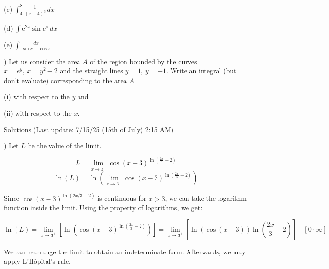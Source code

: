 \documentclass{article}
\begin{document}
\hfill

\noindent (c) $\displaystyle \int_4^8 \frac{1}{(x-4)^3}\, dx$

\hfill

\noindent (d) $\displaystyle \int\mathrm{e}^{2x}\sin e^x\,dx$

\hfill

\noindent (e) $\displaystyle \int\frac{dx}{\sin x - \cos x}$

\hfill

) Let us consider the area $A$ of the region bounded by the curves $x=e^y, \, x=y^2-2$ and the straight lines $y=1, \, y=-1$. Write an integral (but don't evaluate) corresponding to the area $A$

\hfill

\noindent (i) with respect to the $y$ and

\noindent (ii) with respect to the $x$.

\newpage

\begin{center}
Solutions (Last update: 7/15/25 (15th of July) 2:15 AM)
\end{center}

) Let $L$ be the value of the limit.

\begin{equation*} L = \lim_{x\to3^+}\cos(x-3)^{\ln\left(\frac{2x}{3}-2\right)}\end{equation*}
\begin{equation*}\ln(L) =\ln\left( \lim_{x\to3^+}\cos(x-3)^{\ln\left(\frac{2x}{3}-2\right)}\right)\end{equation*}

\hfill

\noindent Since $\cos(x-3)^{\ln(2x/3 -2)}$ is continuous for $x>3$, we can take the logarithm function inside the limit. Using the property of logarithms, we get:

\begin{equation*}\ln(L) =\lim_{x\to3^+}\left[ \ln\left(\cos(x-3)^{\ln\left(\frac{2x}{3}-2\right)}\right)\right] = \lim_{x\to3^+}\left[ \ln\left(\cos(x-3)\right)\ln\left(\frac{2x}{3}-2\right)\right]\quad[0 \cdot \infty] \end{equation*}

\hfill

\noindent We can rearrange the limit to obtain an indeterminate form. Afterwards, we may apply L'Hôpital's rule.
\end{document}
